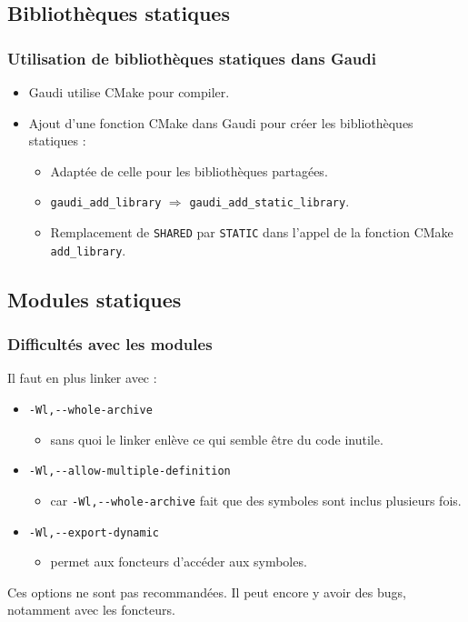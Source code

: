 \documentclass{beamer}
\begin{document}
\subsection{Bibliothèques statiques}

\begin{frame}[fragile]
    \frametitle{Utilisation de bibliothèques statiques dans Gaudi}

    \begin{itemize}
        \item Gaudi utilise CMake pour compiler.
        \item Ajout d'une fonction CMake dans Gaudi pour créer les bibliothèques statiques :
              \begin{itemize}
                  \item Adaptée de celle pour les bibliothèques partagées.
                  \item \verb'gaudi_add_library' $\Rightarrow$ \verb'gaudi_add_static_library'.
                  \item Remplacement de \verb'SHARED' par \verb'STATIC' dans l'appel de la fonction CMake \verb'add_library'.
              \end{itemize}
    \end{itemize}
\end{frame}

\subsection{Modules statiques}

\begin{frame}[fragile]
    \frametitle{Difficultés avec les modules}

    Il faut en plus linker avec :
    \begin{itemize}
        \item \verb'-Wl,--whole-archive'
              \begin{itemize}
                  \item sans quoi le linker enlève ce qui semble être du code inutile.
              \end{itemize}
        \item \verb'-Wl,--allow-multiple-definition'
              \begin{itemize}
                  \item car \verb'-Wl,--whole-archive' fait que des symboles sont inclus plusieurs fois.
              \end{itemize}
        \item \verb'-Wl,--export-dynamic'
              \begin{itemize}
                  \item permet aux foncteurs d'accéder aux symboles.
              \end{itemize}
    \end{itemize}

    Ces options ne sont pas recommandées.
    Il peut encore y avoir des bugs, notamment avec les foncteurs.
\end{frame}
\end{document}
